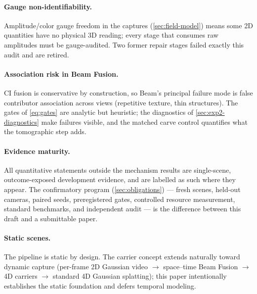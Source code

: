 \paragraph{Gauge non-identifiability.}
Amplitude/color gauge freedom in the captures (\cref{sec:field-model}) means some 2D
quantities have no physical 3D reading; every stage that consumes raw amplitudes must be
gauge-audited.  Two former repair stages failed exactly this audit and are retired.

\paragraph{Association risk in Beam Fusion.}
CI fusion is conservative by construction, so Beam's principal failure mode is false
contributor association across views (repetitive texture, thin structures).  The gates of
\cref{eq:gates} are analytic but heuristic; the diagnostics of \cref{sec:exp2-diagnostics}
make failures visible, and the matched carve control quantifies what the tomographic step
adds.

\paragraph{Evidence maturity.}
All quantitative statements outside the mechanism results are single-scene, outcome-exposed
development evidence, and are labelled as such where they appear.  The confirmatory program
(\cref{sec:obligations}) --- fresh scenes, held-out cameras, paired seeds, preregistered
gates, controlled resource measurement, standard benchmarks, and independent audit --- is
the difference between this draft and a submittable paper.

\paragraph{Static scenes.}
The pipeline is static by design.  The carrier concept extends naturally toward dynamic
capture (per-frame 2D Gaussian video $\to$ space--time Beam Fusion $\to$ 4D carriers
$\to$ standard 4D Gaussian splatting); this paper intentionally establishes the static
foundation and defers temporal modeling.
